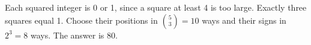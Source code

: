 Each squared integer is 0 or 1, since a square at least 4 is too large. Exactly three squares equal 1. Choose their positions in $\binom53=10 $ ways and their signs in $ 2^3=8 $ ways. The answer is $\boxed{80}$.
